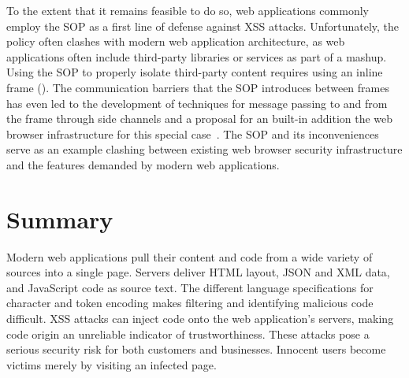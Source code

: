 To the extent that it remains feasible to do so, web applications commonly employ the SOP as a first line of defense against XSS attacks.
Unfortunately, the policy often clashes with modern web application architecture, as web applications often include third-party libraries or services as part of a mashup.
Using the SOP to properly isolate third-party content requires using an inline frame ().
The communication barriers that the SOP introduces between frames has even led to the development of techniques for message passing to and from the frame through side channels and a proposal for an built-in addition the web browser infrastructure for this special case~\cite{barth.etal+08}.
The SOP and its inconveniences serve as an example clashing between existing web browser security infrastructure and the features demanded by modern web applications.

\section{Summary}

Modern web applications pull their content and code from a wide variety of sources into a single page.
Servers deliver HTML layout, JSON and XML data, and JavaScript code as source text.
The different language specifications for character and token encoding makes filtering and identifying malicious code difficult.
XSS attacks can inject code onto the web application's servers, making code origin an unreliable indicator of trustworthiness.
These attacks pose a serious security risk for both customers and businesses.
Innocent users become victims merely by visiting an infected page.

